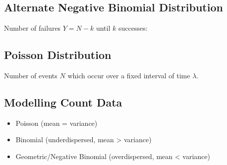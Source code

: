 \documentclass{article}
\begin{document}
\begin{minipage}{62.39259259mm}
    \subsection{Alternate Negative Binomial Distribution}
    Number of failures \(Y = N - k\) until \(k\) successes:
    \subsection{Poisson Distribution}
    Number of events \(N\) which occur over a fixed interval of time \(\lambda\).
    \subsection{Modelling Count Data}
    \begin{itemize}
        \setlength\itemsep{-0.2em}
        \item Poisson (mean = variance)
        \item Binomial (underdispersed, mean > variance)
        \item Geometric/Negative Binomial \newline (overdispersed, mean < variance)
    \end{itemize}
\end{minipage}
\end{document}
